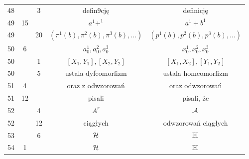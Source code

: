 \documentclass[a4paper,11pt]{article}
\begin{document}
\begin{center}
\begin{tabular}{|c|c|c|c|c|}
    48  & & \hphantom{0}3 & defin9cję & definicję \\
    49  & 15 & & $a^{ 1 } + ^{ 1 }$ & $a^{ 1 } + b^{ 1 }$ \\
    49  & & 20 & $( \pi^{ 1 } ( b ), \pi^{ 2 } ( b ), \pi^{ 3 } ( b ), \ldots )$
           & $( p^{ 1 } ( b ), p^{ 2 } ( b ), p^{ 3 } ( b ), \ldots )$ \\
    50  & \hphantom{0}6 & & $a_{ 0 }^{ 1 }, a_{ 0 }^{ 2 }, a_{ 0 }^{ 3 }$
    & $x_{ 0 }^{ 1 }, x_{ 0 }^{ 2 }, x_{ 0 }^{ 3 }$ \\
    50  & & \hphantom{0}1 & $[ X_{ 1 }, Y_{ 1 }], [ X_{ 2 }, Y_{ 2 } ]$
    & $[ X_{ 1 }, X_{ 2 }], [ Y_{ 1 }, Y_{ 2 } ]$ \\
    50  & & \hphantom{0}5 & ustala dyfeomorfizm & ustala homeomorfizm \\
    51  & \hphantom{0}4 & & oraz z odwzorowań & oraz odwzorowań \\
    51  & 12 & & pisali & pisali, że \\
    52  & & \hphantom{0}4 & $A^{ r }$ & $\mathcal{A}$ \\
    52  & & 12 & ciągłych & odwzorowań ciągłych \\
    53  & & \hphantom{0}6 & $\mathcal{H}$ & $\mathbb{H}$ \\
    54  & \hphantom{0}1 & & $\mathcal{H}$ & $\mathbb{H}$ \\
    \hline
  \end{tabular}





  \newpage


\end{center}
\end{document}
